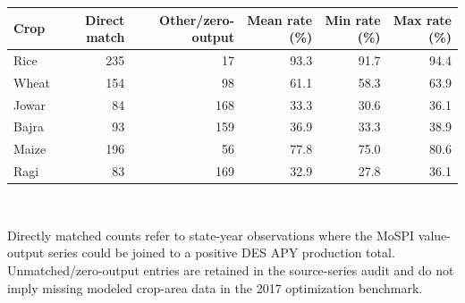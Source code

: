 \begin{small}
\begin{tabular}{lrrrrr}
\toprule
Crop & Direct match & Other/zero-output & Mean rate (\%) & Min rate (\%) & Max rate (\%) \\
\midrule
Rice & 235 & 17 & 93.3 & 91.7 & 94.4 \\
Wheat & 154 & 98 & 61.1 & 58.3 & 63.9 \\
Jowar & 84 & 168 & 33.3 & 30.6 & 36.1 \\
Bajra & 93 & 159 & 36.9 & 33.3 & 38.9 \\
Maize & 196 & 56 & 77.8 & 75.0 & 80.6 \\
Ragi & 83 & 169 & 32.9 & 27.8 & 36.1 \\
\bottomrule
\end{tabular}
\\[0.3em]
\parbox{0.95\linewidth}{\footnotesize Directly matched counts refer to state-year observations where the MoSPI value-output series could be joined to a positive DES APY production total. Unmatched/zero-output entries are retained in the source-series audit and do not imply missing modeled crop-area data in the 2017 optimization benchmark.}
\end{small}

